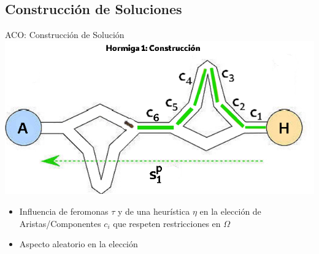 \subsection{Construcci\'on de Soluciones}
\begin{frame}{ACO: Construcci\'on de Soluci\'on}
\centering
\includegraphics[scale=0.35]{Pictures/ACO-ant-Constr.png}
\begin{itemize}
    \item Influencia de feromonas $\tau$ y de una heur\'istica $\eta$ en la elecci\'on de Aristas/Componentes $c_i$ que respeten restricciones en $\Omega$
    \item Aspecto aleatorio en la elecci\'on
\end{itemize}
\end{frame}




